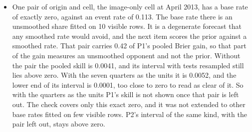 \begin{itemize}
\item One pair of origin and cell, the image-only cell at April 2013, has a base rate of exactly zero, against an event rate of 0.113. The base rate there is an unsmoothed share fitted on 10 visible rows. It is a degenerate forecast that any smoothed rate would avoid, and the next item scores the prior against a smoothed rate. That pair carries 0.42 of P1's pooled Brier gain, so that part of the gain measures an unsmoothed opponent and not the prior. Without the pair the pooled skill is 0.0041, and its interval with tests resampled still lies above zero. With the seven quarters as the units it is 0.0052, and the lower end of its interval is 0.0001, too close to zero to read as clear of it. So with the quarters as the units P1's skill is not shown once that pair is left out. The check covers only this exact zero, and it was not extended to other base rates fitted on few visible rows. P2's interval of the same kind, with the pair left out, stays above zero.

\end{itemize}
